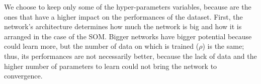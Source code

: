 \begin{table}[h]
    \centering
    \caption{Auto-Encoders architectures list the number of neurons in each layer. SOM architectures list the number of neurons as a tuple (num of rows, num of cols).}
    \label{tab:hyper-params}
\end{table}
We choose to keep only some of the hyper-parameters variables, because are the ones that have a higher impact on the performances of the dataset. First, the network's architecture determines how much the network is big and how it is arranged in the case of the SOM. Bigger networks have bigger potential because could learn more, but the number of data on which is trained ($\rho$) is the same; thus, its performances are not necessarily better, because the lack of data and the higher number of parameters to learn could not bring the network to convergence.

